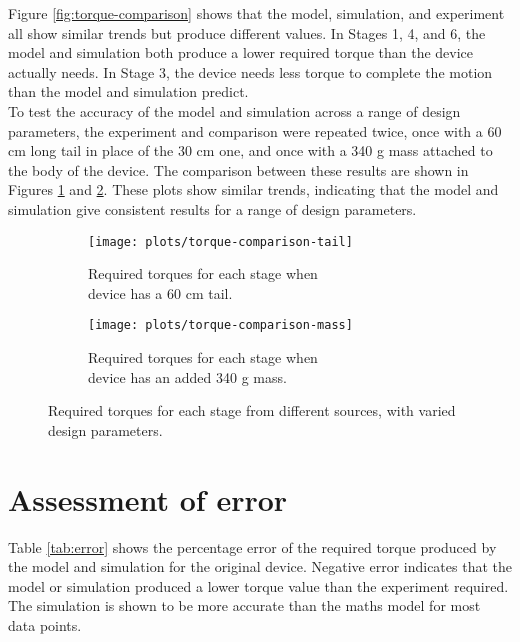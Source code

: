 Figure \ref{fig:torque-comparison} shows that the model, simulation, and experiment all show similar trends but produce different values. In Stages 1, 4, and 6, the model and simulation both produce a lower required torque than the device actually needs. In Stage 3, the device needs less torque to complete the motion than the model and simulation predict.\\
To test the accuracy of the model and simulation across a range of design parameters, the experiment and comparison were repeated twice, once with a 60 cm long tail in place of the 30 cm one, and once with a 340 g mass attached to the body of the device. The comparison between these results are shown in Figures \ref{fig:torque-comparison-tail} and \ref{fig:torque-comparison-mass}. These plots show similar trends, indicating that the model and simulation give consistent results for a range of design parameters.

\begin{figure}
	\centering
	\begin{subfigure}{.5\textwidth}
		\centering
		\texttt{[image: plots/torque-comparison-tail]}
		\caption{Required torques for each stage when \\device has a 60 cm tail.}
		\label{fig:torque-comparison-tail}
	\end{subfigure}%
	\begin{subfigure}{.5\textwidth}
		\centering
		\texttt{[image: plots/torque-comparison-mass]}
		\caption{Required torques for each stage when \\device has an added 340 g mass.}
		\label{fig:torque-comparison-mass}
	\end{subfigure}
	\caption{Required torques for each stage from different sources, with varied design parameters.}
	\label{fig:torque-comparison-tailMass}
\end{figure}


 
\section{Assessment of error}

Table \ref{tab:error} shows the percentage error of the required torque produced by the model and simulation for the original device. Negative error indicates that the model or simulation produced a lower torque value than the experiment required. The simulation is shown to be more accurate than the maths model for most data points.\\

